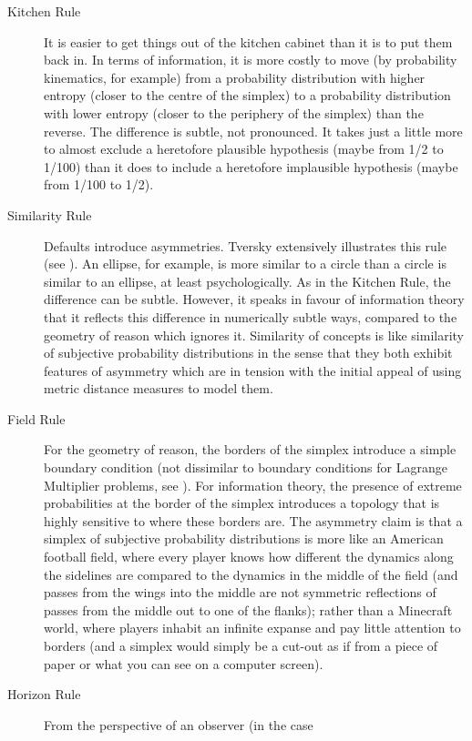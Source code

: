 \documentclass[11pt]{article}
\begin{document}
\begin{description}
\item[Kitchen Rule] It is easier to get things out of the kitchen
  cabinet than it is to put them back in. In terms of information, it
  is more costly to move (by probability kinematics, for example) from
  a probability distribution with higher entropy (closer to the centre
  of the simplex) to a probability distribution with lower entropy
  (closer to the periphery of the simplex) than the reverse. The
  difference is subtle, not pronounced. It takes just a little more to
  almost exclude a heretofore plausible hypothesis (maybe from 1/2 to
  1/100) than it does to include a heretofore implausible hypothesis
  (maybe from 1/100 to 1/2).
\item[Similarity Rule] Defaults introduce asymmetries. Tversky
  extensively illustrates this rule (see ). An
  ellipse, for example, is more similar to a circle than a circle is
  similar to an ellipse, at least psychologically. As in the Kitchen
  Rule, the difference can be subtle. However, it speaks in favour of
  information theory that it reflects this difference in numerically
  subtle ways, compared to the geometry of reason which ignores it.
  Similarity of concepts is like similarity of subjective probability
  distributions in the sense that they both exhibit features of
  asymmetry which are in tension with the initial appeal of using
  metric distance measures to model them. 
\item[Field Rule] For the geometry of reason, the borders of the
  simplex introduce a simple boundary condition (not dissimilar to
  boundary conditions for Lagrange Multiplier problems, see
  ). For information theory, the presence of
  extreme probabilities at the border of the simplex introduces a
  topology that is highly sensitive to where these borders are. The
  asymmetry claim is that a simplex of subjective probability
  distributions is more like an American football field, where every
  player knows how different the dynamics along the sidelines are
  compared to the dynamics in the middle of the field (and passes from
  the wings into the middle are not symmetric reflections of passes
  from the middle out to one of the flanks); rather than a Minecraft
  world, where players inhabit an infinite expanse and pay little
  attention to borders (and a simplex would simply be a cut-out as if
  from a piece of paper or what you can see on a computer screen).
\item[Horizon Rule] From the perspective of an observer (in the case

\end{description}
\end{document}
